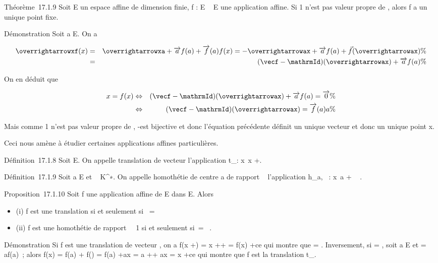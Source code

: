 \documentclass[]{article}
\begin{document}
Théorème~17.1.9 Soit E un espace affine de dimension finie, f : E \rightarrow~ E
une application affine. Si 1 n'est pas valeur propre de
\vecf, alors f a un unique point fixe.

Démonstration Soit a \in E. On a

\begin{align*}
\overrightarrowxf(x)& =&
\overrightarrowxa +\overrightarrow
af(a) +\overrightarrow f(a)f(x) =
-\overrightarrowax +\overrightarrow
af(a) +\vec
f(\overrightarrowax)\%&
\\ & =& (\vecf
-\mathrmId)(\overrightarrowax)
+\overrightarrow af(a) \%&
\\ \end{align*}

On en déduit que

\begin{align*} x = f(x)&
\Leftrightarrow & (\vecf
-\mathrmId)(\overrightarrowax)
+\overrightarrow af(a)
=\overrightarrow 0\%&
\\ & \Leftrightarrow &
(\vecf
-\mathrmId)(\overrightarrowax)
=\overrightarrow f(a)a \%&
\\ \end{align*}

Mais comme 1 n'est pas valeur propre de \vecf,
\vecf -\mathrmId est bijective et
donc l'équation précédente définit un unique vecteur
\overrightarrowax et donc un unique point x.

Ceci nous amène à étudier certaines applications affines particulières.

Définition~17.1.8 Soit \overrightarrow\xi
\in\overrightarrow E. On appelle translation de vecteur
\overrightarrow\xi l'application
t_\overrightarrow\xi :
x\mapsto~x +\overrightarrow \xi.

Définition~17.1.9 Soit a \in E et \lambda~ \in K^∗. On appelle
homothétie de centre a de rapport \lambda~ l'application h_a,\lambda~ :
x\mapsto~a + \lambda~ \overrightarrowax.

Proposition~17.1.10 Soit f une application affine de E dans E. Alors

\begin{itemize}
\itemsep1pt\parskip0pt
\item
  (i) f est une translation si et seulement si~\vecf
  = \mathrmId
\item
  (ii) f est une homothétie de rapport \lambda~\neq~1 si
  et seulement si~\vecf =
  \lambda~\mathrmId.
\end{itemize}

Démonstration Si f est une translation de vecteur
\overrightarrow\xi, on a f(x
+\overrightarrow \eta) = x
+\overrightarrow \eta +\overrightarrow
\xi = f(x) +\overrightarrow \eta ce qui montre que
\vecf = \mathrmId. Inversement, si
\vecf = \mathrmId, soit a \in E et
\overrightarrow\xi =\overrightarrow
af(a)~; alors f(x) = f(a) +\vec
f(\overrightarrowax) = f(a)
+\overrightarrow ax = a
+\overrightarrow \xi +\overrightarrow
ax = x +\overrightarrow \xi ce qui montre que f est
la translation t_\overrightarrow\xi.
\end{document}
